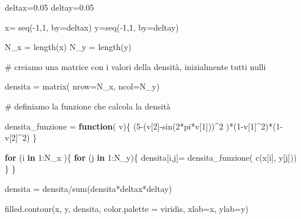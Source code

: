 \documentclass[
  italian,
  letterpaper,
]{book}
\newenvironment{Shaded}{\begin{snugshade}}{\end{snugshade}}
\newcommand{\AttributeTok}[1]{\textcolor[rgb]{0.40,0.45,0.13}{#1}}
\newcommand{\CommentTok}[1]{\textcolor[rgb]{0.37,0.37,0.37}{#1}}
\newcommand{\ControlFlowTok}[1]{\textcolor[rgb]{0.00,0.23,0.31}{\textbf{#1}}}
\newcommand{\DecValTok}[1]{\textcolor[rgb]{0.68,0.00,0.00}{#1}}
\newcommand{\FloatTok}[1]{\textcolor[rgb]{0.68,0.00,0.00}{#1}}
\newcommand{\FunctionTok}[1]{\textcolor[rgb]{0.28,0.35,0.67}{#1}}
\newcommand{\NormalTok}[1]{\textcolor[rgb]{0.00,0.23,0.31}{#1}}
\newcommand{\OtherTok}[1]{\textcolor[rgb]{0.00,0.23,0.31}{#1}}
\newcommand{\SpecialCharTok}[1]{\textcolor[rgb]{0.37,0.37,0.37}{#1}}
\newcommand{\StringTok}[1]{\textcolor[rgb]{0.13,0.47,0.30}{#1}}
\theoremstyle{definition}
\theoremstyle{remark}
\begin{document}
\begin{Shaded}
\begin{Highlighting}[]
\NormalTok{deltax}\OtherTok{=}\FloatTok{0.05}
\NormalTok{deltay}\OtherTok{=}\FloatTok{0.05}

\NormalTok{x}\OtherTok{=} \FunctionTok{seq}\NormalTok{(}\SpecialCharTok{{-}}\DecValTok{1}\NormalTok{,}\DecValTok{1}\NormalTok{, }\AttributeTok{by=}\NormalTok{deltax)}
\NormalTok{y}\OtherTok{=}\FunctionTok{seq}\NormalTok{(}\SpecialCharTok{{-}}\DecValTok{1}\NormalTok{,}\DecValTok{1}\NormalTok{, }\AttributeTok{by=}\NormalTok{deltay)}

\NormalTok{N\_x }\OtherTok{=} \FunctionTok{length}\NormalTok{(x)}
\NormalTok{N\_y }\OtherTok{=} \FunctionTok{length}\NormalTok{(y)}


\CommentTok{\# creiamo una matrice con i valori della densità, inizialmente tutti nulli}

\NormalTok{densita }\OtherTok{=} \FunctionTok{matrix}\NormalTok{(  }\AttributeTok{nrow=}\NormalTok{N\_x, }\AttributeTok{ncol=}\NormalTok{N\_y)}

\CommentTok{\# definiamo la funzione che calcola la densità}

\NormalTok{densita\_funzione }\OtherTok{=} \ControlFlowTok{function}\NormalTok{( v)\{}
\NormalTok{  (}\DecValTok{5}\SpecialCharTok{{-}}\NormalTok{(v[}\DecValTok{2}\NormalTok{]}\SpecialCharTok{{-}}\FunctionTok{sin}\NormalTok{(}\DecValTok{2}\SpecialCharTok{*}\NormalTok{pi}\SpecialCharTok{*}\NormalTok{v[}\DecValTok{1}\NormalTok{]))}\SpecialCharTok{\^{}}\DecValTok{2}\NormalTok{ )}\SpecialCharTok{*}\NormalTok{(}\DecValTok{1}\SpecialCharTok{{-}}\NormalTok{v[}\DecValTok{1}\NormalTok{]}\SpecialCharTok{\^{}}\DecValTok{2}\NormalTok{)}\SpecialCharTok{*}\NormalTok{(}\DecValTok{1}\SpecialCharTok{{-}}\NormalTok{v[}\DecValTok{2}\NormalTok{]}\SpecialCharTok{\^{}}\DecValTok{2}\NormalTok{)}
\NormalTok{\}}

\ControlFlowTok{for}\NormalTok{ (i }\ControlFlowTok{in} \DecValTok{1}\SpecialCharTok{:}\NormalTok{N\_x  )\{}
  \ControlFlowTok{for}\NormalTok{ (j }\ControlFlowTok{in} \DecValTok{1}\SpecialCharTok{:}\NormalTok{N\_y)\{}
\NormalTok{    densita[i,j]}\OtherTok{=} \FunctionTok{densita\_funzione}\NormalTok{( }\FunctionTok{c}\NormalTok{(x[i], y[j]))}
\NormalTok{  \}}
\NormalTok{\}}

\NormalTok{densita }\OtherTok{=}\NormalTok{ densita}\SpecialCharTok{/}\FunctionTok{sum}\NormalTok{(densita}\SpecialCharTok{*}\NormalTok{deltax}\SpecialCharTok{*}\NormalTok{deltay)}



\FunctionTok{filled.contour}\NormalTok{(x, y, densita, }\AttributeTok{color.palette =}\NormalTok{  viridis, }\AttributeTok{xlab=}\StringTok{\textquotesingle{}x\textquotesingle{}}\NormalTok{, }\AttributeTok{ylab=}\StringTok{\textquotesingle{}y\textquotesingle{}}\NormalTok{)}
\end{Highlighting}
\end{Shaded}
\end{document}

